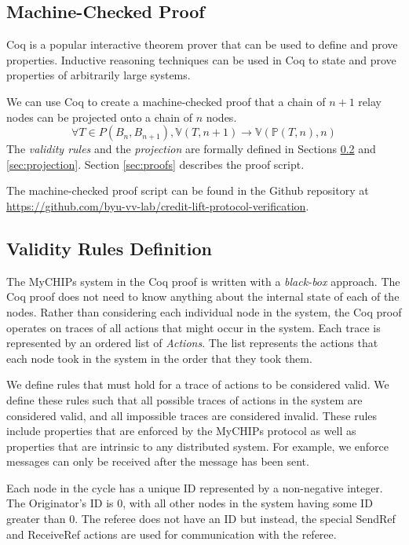 \documentclass[runningheads]{llncs}
\newcommand{\actsvalid}[2]{\mathds{V}(#1, #2)}
\newcommand{\projectsize}[2]{\mathds{P}(#1, #2)}
\newcommand{\coderepository}{Github repository at \url{https://github.com/byu-vv-lab/credit-lift-protocol-verification}}
\newif\ifcomments
\newcommand{\krs}[1]{\ifcomments\textcolor{blue}{krs: #1}\fi}
\begin{document}
\subsection{Machine-Checked Proof}
Coq is a popular interactive theorem prover that can be used to define and prove properties. Inductive reasoning techniques can be used in Coq to state and prove properties of arbitrarily large systems. 

We can use Coq to create a machine-checked proof that a chain of $n+1$ relay nodes can be projected onto a chain of $n$ nodes.
$$\forall T \in P(B_n, B_{n+1}), 
\actsvalid{T}{n+1} \longrightarrow
\actsvalid{\projectsize{T}{n}}{n}$$
The \emph{validity rules} and the \emph{projection} are formally defined in Sections \ref{sec:definitions} and \ref{sec:projection}. Section \ref{sec:proofs} describes the proof script.

The machine-checked proof script can be found in the \coderepository.

\subsection{Validity Rules Definition} \label{sec:definitions}
The MyCHIPs system in the Coq proof is written with a \emph{black-box} approach. The Coq proof does not need to know anything about the internal state of each of the nodes. Rather than considering each individual node in the system, the Coq proof operates on traces of all actions that might occur in the system. Each trace is represented by an ordered list of \emph{Actions}. The list represents the actions that each node took in the system in the order that they took them.

We define rules that must hold for a trace of actions to be considered valid. We define these rules such that all possible traces of actions in the system are considered valid, and all impossible traces are considered invalid. These rules include properties that are enforced by the MyCHIPs protocol as well as properties that are intrinsic to any distributed system. For example, we enforce  messages can only be received after the message has been sent.

\krs{We don't talk about ignoring PEND messages, but I think it just distracts from the message. We can probably omit it. Folks might ask because it is in the Mealy Machines}

Each node in the cycle has a unique ID represented by a non-negative integer. The Originator's ID is 0, with all other nodes in the system having some ID greater than 0. The referee does not have an ID but instead, the special SendRef and ReceiveRef actions are used for communication with the referee. 
\end{document}
